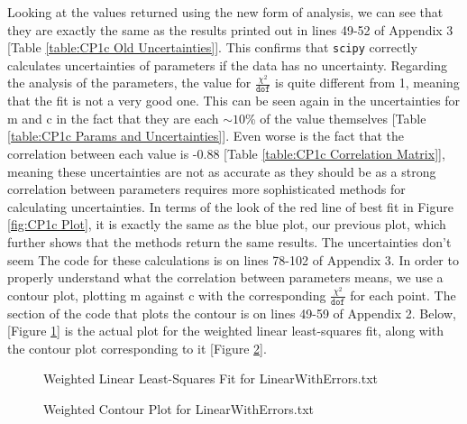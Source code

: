 \documentclass[12pt]{article}
\begin{document}
    \noindent
    Looking at the values returned using the new form of analysis, we can see that they are 
    exactly the same as the results printed out in lines 49-52 of Appendix 3 [Table 
    \ref{table:CP1c Old Uncertainties}]. This confirms that \texttt{scipy} correctly calculates 
    uncertainties of parameters if the data has no uncertainty. Regarding the analysis of the 
    parameters, the value for $\frac{\chi^2}{\texttt{dof}}$ is quite different from 1, meaning 
    that the fit is not a very good one. This can be seen again in the uncertainties for m and c 
    in the fact that they are each $\sim10$\% of the value themselves [Table \ref{table:CP1c Params 
    and Uncertainties}]. Even worse is the fact that the correlation between each value is -0.88 
    [Table \ref{table:CP1c Correlation Matrix}], meaning these uncertainties are not as accurate 
    as they should be as a strong correlation between parameters requires more sophisticated 
    methods for calculating uncertainties. In terms of the look of the red line of best fit in 
    Figure \ref{fig:CP1c Plot}, it is exactly the same as the blue plot, our previous plot, 
    which further shows that the methods return the same results. The uncertainties don't seem 
    The code for these calculations is on lines 78-102 of Appendix 3.
    \newline
    \newline
    In order to properly understand what the correlation between parameters means, we use a contour 
    plot, plotting m against c with the corresponding $\frac{\chi^2}{\texttt{dof}}$ for each point. 
    The section of the code that plots the contour is on lines 49-59 of Appendix 2. Below, 
    [Figure \ref{fig:Weighted Linear}] is the actual plot for the weighted linear least-squares 
    fit, along with the contour plot corresponding to it [Figure \ref{fig:Weighted Contour}].
    
    \begin{figure}[H]
        \begin{center}
            \scalebox{.7}{}
            \caption{Weighted Linear Least-Squares Fit for LinearWithErrors.txt}
            \label{fig:Weighted Linear}
        \end{center}
    \end{figure}
    
    \begin{figure}[H]
        \begin{center}
            \scalebox{.7}{}
            \caption{Weighted Contour Plot for LinearWithErrors.txt}
            \label{fig:Weighted Contour}
        \end{center}
    \end{figure}
    
\end{document}
